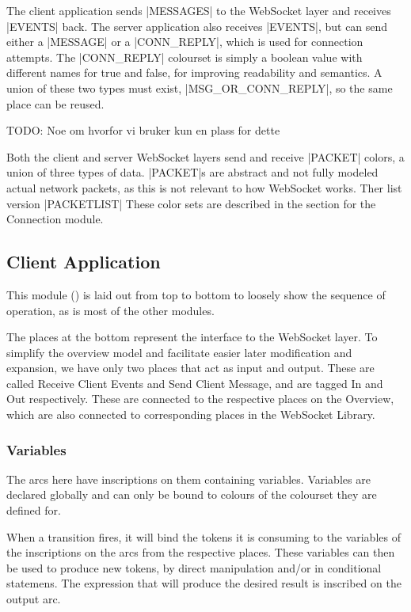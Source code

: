 	The client application sends |MESSAGES| to the WebSocket layer and
	receives |EVENTS| back. The server application also receives
	|EVENTS|, but can send either a |MESSAGE| or a
	|CONN_REPLY|, which is used for connection attempts. The
	|CONN_REPLY| colourset is simply a boolean value with different
	names for true and false, for improving readability and semantics. A union of
	these two types must exist, |MSG_OR_CONN_REPLY|, so the same place
	can be reused.
	
	TODO: Noe om hvorfor vi bruker kun en plass for dette
	
	Both the client and server WebSocket layers send and receive
	|PACKET| colors, a union of three types of data. |PACKET|s
	are abstract and not fully modeled actual network packets, as this is not
	relevant to how WebSocket works. Ther list version |PACKETLIST| These
	color sets are described in the section for the Connection module.

\subsection{Client Application}

	
	This module () is laid out from top to bottom to loosely show
	the sequence of operation, as is most of the other modules.
	
	The places at the bottom represent the interface to the WebSocket layer. To
	simplify the overview model and facilitate easier later modification
	and expansion, we have only two places that act as input and output. These are
	called Receive Client Events and Send Client Message, and are tagged In and
	Out respectively. These are connected to the respective places on the
	Overview, which are also connected to corresponding places in the WebSocket
	Library.
	
	
	\subsubsection{Variables}
	
		The arcs here have inscriptions on them containing variables. Variables are
		declared globally and can only be bound to colours of the colourset they are
		defined for. 
		
		When a transition fires, it will bind the tokens it is consuming to the
		variables of the inscriptions on the arcs from the respective places. These
		variables can then be used to produce new tokens, by direct manipulation
		and/or in conditional statemens. The expression that will produce the desired
		result is inscribed on the output arc. 
		

